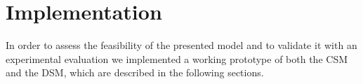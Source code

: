 \section{Implementation}\label{sec:implementation}

In order to assess the feasibility of the presented model and to validate it with an experimental evaluation we implemented a working prototype of both the CSM and the DSM, which are described in the following sections.



